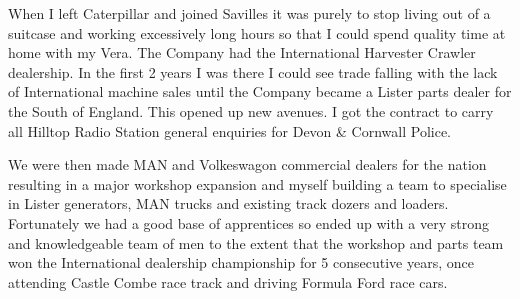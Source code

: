 When I left Caterpillar and joined Savilles it was purely to stop living out of
a suitcase and working excessively long hours so that I could spend quality
time at home with my Vera. The Company had the International Harvester Crawler
dealership. In the first 2 years I was there I could see trade falling with
the lack of International machine sales until the Company became a Lister parts
dealer for the South of England. This opened up new avenues. I got the
contract to carry all Hilltop Radio Station general enquiries for Devon \&
Cornwall Police.

We were then made MAN and Volkeswagon commercial dealers for the nation
resulting in a major workshop expansion and myself building a team to
specialise in Lister generators, MAN trucks and existing track dozers and
loaders. Fortunately we had a good base of apprentices so ended up with a very
strong and knowledgeable team of men to the extent that the workshop and parts
team won the International dealership championship for 5 consecutive years,
once attending Castle Combe race track and driving Formula Ford race cars.

